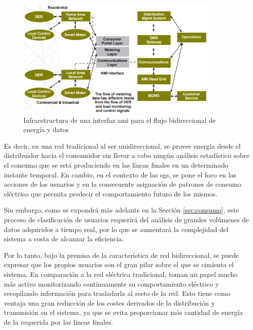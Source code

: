 \vspace{3mm}

\begin{figure}[h!]
  \centering
  \includegraphics[width=0.9\textwidth]{img/teoria/bidir.png}
  \caption{Infraestructura de una interfaz \acrshort{ami} para el flujo bidireccional de energía y datos \cite{us}}
  \label{fig:bidireccional2}
\end{figure}

Es decir, en una red tradicional al ser unidireccional, se provee energía desde el distribuidor hacia el consumidor sin llevar a cabo ningún análisis estadístico sobre el consumo que se está produciendo en las líneas finales en un determinado instante temporal. En cambio, en el contexto de las \gls{sg}s, se pone el foco en las acciones de los usuarios y en la consecuente asignación de patrones de consumo eléctrico que permita predecir el comportamiento futuro de los mismos. \cite{convencional}

\vspace{3mm}

Sin embargo, como se expondrá más adelante en la Sección \ref{sec:consumo}, este proceso de clasificación de usuarios requerirá del análisis de grandes volúmenes de datos adquiridos a tiempo real, por lo que se aumentará la complejidad del sistema a costa de alcanzar la eficiencia.

\vspace{3mm}

Por lo tanto, bajo la premisa de la característica de red bidireccional, se puede expresar que los propios usuarios son el gran pilar sobre el que se cimienta el sistema. En comparación a la red eléctrica tradicional, toman un papel mucho más activo monitorizando continuamente su comportamiento eléctrico y recopilando información para trasladarla al resto de la red. Esto tiene como ventaja una gran reducción de los costes derivados de la distribución y transmisión en el sistema, ya que se evita proporcionar más cantidad de energía de la requerida por las líneas finales. \cite{iotfutura}

